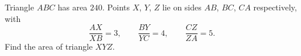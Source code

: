Triangle $ABC$ has area $240$. Points $X$, $Y$, $Z$ lie on sides $AB$, $BC$, $CA$ respectively, with
\[
\dfrac{AX}{XB}=3,\qquad \dfrac{BY}{YC}=4,\qquad \dfrac{CZ}{ZA}=5 .
\]
Find the area of triangle $XYZ$.
